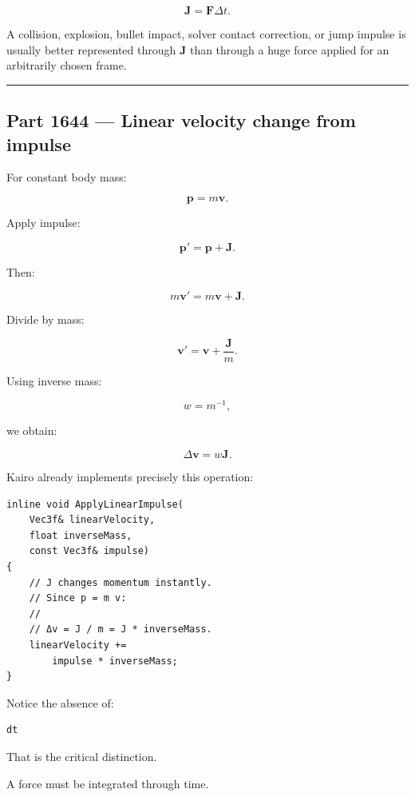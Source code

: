 \[
\mathbf J
=
\mathbf F\Delta t.
\]

A collision, explosion, bullet impact, solver contact correction, or jump impulse is usually better represented through \(\mathbf J\) than through a huge force applied for an arbitrarily chosen frame.

\begin{center}\rule{0.5\linewidth}{0.5pt}\end{center}

\subsection{Part 1644 --- Linear velocity change from impulse}\label{06-engine-ii-ch036-part-1644-linear-velocity-change-from-impulse}

\hypertarget{06-engine-ii-ch036-part-1644-linear-velocity-change-from-impulse}{}

For constant body mass:

\[
\mathbf p=m\mathbf v.
\]

Apply impulse:

\[
\mathbf p'
=
\mathbf p+\mathbf J.
\]

Then:

\[
m\mathbf v'
=
m\mathbf v+\mathbf J.
\]

Divide by mass:

\[
\boxed{
\mathbf v'
=
\mathbf v+
\frac{\mathbf J}{m}.
}
\]

Using inverse mass:

\[
w=m^{-1},
\]

we obtain:

\[
\boxed{
\Delta\mathbf v
=
w\mathbf J.
}
\]

Kairo already implements precisely this operation:

\begin{verbatim}
inline void ApplyLinearImpulse(
    Vec3f& linearVelocity,
    float inverseMass,
    const Vec3f& impulse)
{
    // J changes momentum instantly.
    // Since p = m v:
    //
    // Δv = J / m = J * inverseMass.
    linearVelocity +=
        impulse * inverseMass;
}
\end{verbatim}

Notice the absence of:

\begin{verbatim}
dt
\end{verbatim}

That is the critical distinction.

A force must be integrated through time.

